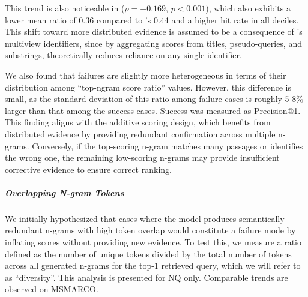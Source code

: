 This trend is also noticeable in  ($\rho = -0.169$, $p < 0.001$), which also exhibits a lower mean ratio of 0.36 compared to 's 0.44 and a higher hit rate in all deciles. This shift toward more distributed evidence is assumed to be a consequence of 's multiview identifiers, since by aggregating scores from titles, pseudo-queries, and substrings,  theoretically reduces reliance on any single identifier.

We also found that failures are slightly more heterogeneous in terms of their distribution among ``top-ngram score ratio'' values. However, this difference is small, as the standard deviation of this ratio among failure cases is roughly 5-8\% larger than that among the success cases. Success was measured as Precision@1. This finding aligns with the additive scoring design, which benefits from distributed evidence by providing redundant confirmation across multiple n-grams.
Conversely, if the top-scoring n-gram matches many passages or identifies the wrong one, the remaining low-scoring n-grams may provide insufficient corrective evidence to ensure correct ranking.


\subparagraph{Overlapping N-gram Tokens}
\label{sec:overlapping-ngram-tokens}

We initially hypothesized that cases where the model produces semantically redundant n-grams with high token overlap would constitute a failure mode by inflating scores without providing new evidence. To test this, we measure a ratio defined as the number of unique tokens divided by the total number of tokens across all generated n-grams for the top-1 retrieved query, which we will refer to as ``diversity''. This analysis is presented for NQ only. Comparable trends are observed on MSMARCO.

